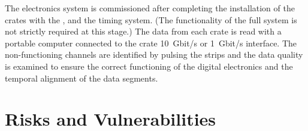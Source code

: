 The electronics system %
is commissioned after completing the installation of the  crates with the , and the timing system. %
(The functionality of the full  system is not strictly required at this stage.) The data from each crate %
is read with a portable computer connected to the crate  \SI{10}{Gbit/s} or \SI{1}{Gbit/s} interface. %
The non-functioning channels are identified by pulsing the  strips and the data quality is examined to ensure the correct functioning of the digital electronics and the temporal alignment of the data segments.   






\section{Risks and Vulnerabilities}
\label{sec:fddp-tpc-elec-risks}

